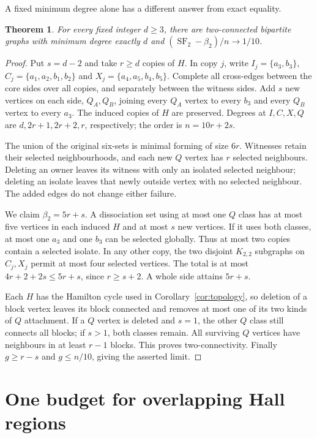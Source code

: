 \documentclass[11pt]{article}
\newtheorem{theorem}{Theorem}
\newcommand{\SF}{\operatorname{SF}_2}
\newcommand{\diss}{\beta_2}
\begin{document}
A fixed minimum degree alone has a different answer from exact equality.

\begin{theorem}\label{thm:mindegree}
For every fixed integer $d\ge3$, there are two-connected bipartite graphs with
minimum degree exactly $d$ and
$(\SF-\diss)/n\longrightarrow1/10$.
\end{theorem}
\begin{proof}
Put $s=d-2$ and take $r\ge d$ copies of $H$. In copy $j$, write
$I_j=\{a_3,b_3\}$, $C_j=\{a_1,a_2,b_1,b_2\}$ and
$X_j=\{a_4,a_5,b_4,b_5\}$. Complete all cross-edges between the core
sides over all copies, and separately between the witness sides.
Add $s$ new vertices on each side, $Q_A,Q_B$, joining every $Q_A$
vertex to every $b_3$ and every $Q_B$ vertex to every $a_3$.
The induced copies of $H$ are preserved. Degrees at $I,C,X,Q$ are
$d,2r+1,2r+2,r$, respectively; the order is $n=10r+2s$.

The union of the original six-sets is minimal forming of size $6r$.
Witnesses retain their selected neighbourhoods, and each new $Q$ vertex
has $r$ selected neighbours. Deleting an owner leaves its witness with
only an isolated selected neighbour; deleting an isolate leaves that
newly outside vertex with no selected neighbour. The added edges do
not change either failure.

We claim $\diss=5r+s$. A dissociation set using at most one $Q$ class
has at most five vertices in each induced $H$ and at most $s$ new
vertices. If it uses both classes, at most one $a_3$ and one $b_3$ can
be selected globally. Thus at most two copies contain a selected
isolate. In any other copy, the two disjoint $K_{2,2}$ subgraphs on
$C_j,X_j$ permit at most four selected vertices. The total is at most
$4r+2+2s\le5r+s$, since $r\ge s+2$. A whole side attains $5r+s$.

Each $H$ has the Hamilton cycle used in Corollary~\ref{cor:topology},
so deletion of a block vertex leaves its block connected and removes
at most one of its two kinds of $Q$ attachment. If a $Q$ vertex is
deleted and $s=1$, the other $Q$ class still connects all blocks; if
$s>1$, both classes remain. All surviving $Q$ vertices have neighbours
in at least $r-1$ blocks. This proves two-connectivity.
Finally $g\ge r-s$ and $g\le n/10$, giving the asserted limit.
\end{proof}


\appendix
\section{One budget for overlapping Hall regions}
\end{document}
